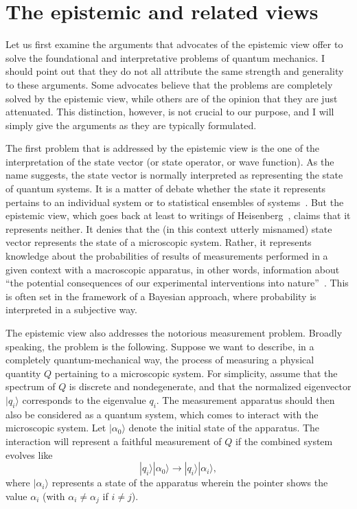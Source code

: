 \documentclass[12pt]{article}
\begin{document}
\section{The epistemic and related views}
%
Let us first examine the arguments that
advocates of the epistemic view offer to solve
the foundational and interpretative problems of
quantum mechanics.  I should point out that they
do not all attribute the same strength and generality to
these arguments.  Some advocates believe that the
problems are completely solved by the epistemic view,
while others are of the opinion
that they are just attenuated.  This distinction,
however, is not crucial to our purpose, and I will simply
give the arguments as they are typically formulated.

The first problem that is addressed by the epistemic
view is the one of the interpretation of the state
vector (or state operator, or wave function).
As the name suggests, the state vector is normally
interpreted as representing the state of quantum
systems.  It is a matter of debate whether the state it
represents pertains to an individual system or to statistical
ensembles of systems~\cite{ballentine}.  But the epistemic
view, which goes back at least to writings of
Heisenberg~\cite{heisenberg}, claims that it represents
neither.  It denies that the (in this context utterly
misnamed) state vector represents the state of a
microscopic system.  Rather, it represents
knowledge about the probabilities of results of
measurements performed in a given context with a
macroscopic apparatus, in other words, information about
``the potential consequences of our experimental
interventions into nature''~\cite{fuchs2}.  This
is often set in the framework of a Bayesian approach,
where probability is interpreted in a subjective way.

The epistemic view also addresses the notorious
measurement problem.  Broadly speaking, the problem
is the following.  Suppose we want to describe, in a
completely quantum-mechanical way, the process of
measuring a physical quantity $Q$ pertaining to a
microscopic system.  For simplicity, assume that the
spectrum of $Q$ is discrete and nondegenerate, and
that the normalized eigenvector $|q_i\rangle$
corresponds to the eigenvalue $q_i$.  The measurement
apparatus should then also be considered as a quantum
system, which comes to interact with the microscopic system.
Let $|\alpha_0 \rangle$ denote the initial state of the
apparatus.  The interaction will represent a faithful
measurement of $Q$ if the combined system evolves like
%
\begin{equation}
|q_i \rangle |\alpha_0 \rangle \rightarrow
|q_i \rangle |\alpha_i \rangle ,
\end{equation}
%
where $|\alpha_i \rangle$ represents a state of the
apparatus wherein the pointer shows the value
$\alpha_i$ (with $\alpha_i \neq \alpha_j$ 
if $i \neq j$).
\end{document}
